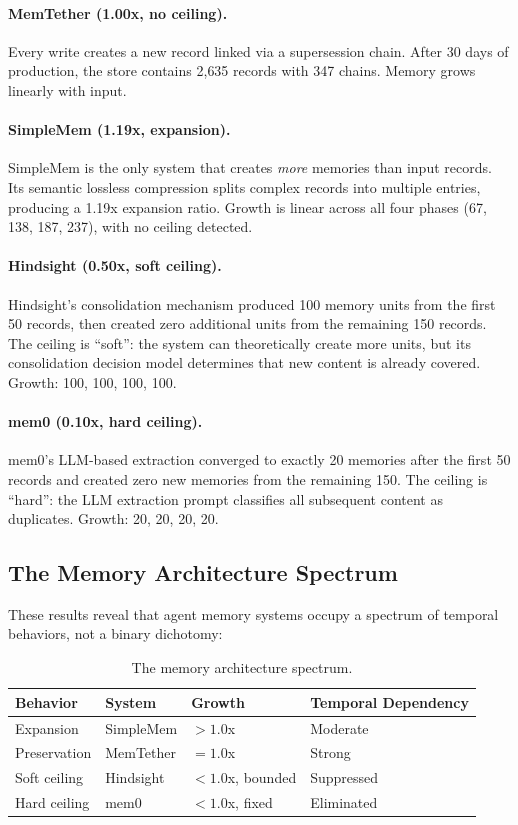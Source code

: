 \documentclass[sigconf,nonacm]{acmart}
\begin{document}
\paragraph{MemTether (1.00x, no ceiling).} Every write creates a new record linked via a supersession chain. After 30 days of production, the store contains 2{,}635 records with 347 chains. Memory grows linearly with input.

\paragraph{SimpleMem (1.19x, expansion).} SimpleMem is the only system that creates \emph{more} memories than input records. Its semantic lossless compression splits complex records into multiple entries, producing a 1.19x expansion ratio. Growth is linear across all four phases (67, 138, 187, 237), with no ceiling detected.

\paragraph{Hindsight (0.50x, soft ceiling).} Hindsight's consolidation mechanism produced 100 memory units from the first 50 records, then created zero additional units from the remaining 150 records. The ceiling is ``soft'': the system can theoretically create more units, but its consolidation decision model determines that new content is already covered. Growth: 100, 100, 100, 100.

\paragraph{mem0 (0.10x, hard ceiling).} mem0's LLM-based extraction converged to exactly 20 memories after the first 50 records and created zero new memories from the remaining 150. The ceiling is ``hard'': the LLM extraction prompt classifies all subsequent content as duplicates. Growth: 20, 20, 20, 20.

\subsection{The Memory Architecture Spectrum}

These results reveal that agent memory systems occupy a spectrum of temporal behaviors, not a binary dichotomy:

\begin{table}[h]
\centering
\caption{The memory architecture spectrum.}
\begin{tabular}{llll}
\toprule
Behavior & System & Growth & Temporal Dependency \\
\midrule
Expansion & SimpleMem & $> 1.0$x & Moderate \\
Preservation & MemTether & $= 1.0$x & Strong \\
Soft ceiling & Hindsight & $< 1.0$x, bounded & Suppressed \\
Hard ceiling & mem0 & $< 1.0$x, fixed & Eliminated \\
\bottomrule
\end{tabular}
\end{table}
\end{document}

